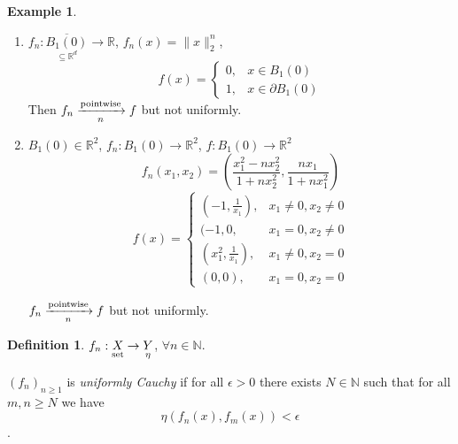 \documentclass[12pt]{amsbook}
\theoremstyle{definition}
\newtheorem{definition}[theorem]{Definition}
\newtheorem{example}[theorem]{Example}
\newcommand{\NN}{{\mathbb N}}
\newcommand{\RR}{{\mathbb R}}
\newcommand{\ra}{\rightarrow} %
\begin{document}
\begin{example} \
\begin{enumerate}
\item $f_n: \underset{\subseteq \RR^d}{\overline{B_1(0)}} \ra \RR$, $f_n(x) = \|x\|^n_2$,
\begin{equation*}
f(x)=\left\{\begin{array}{ll}{0,} & {x \in B_1(0)} \\ {1,} & {x \in \partial B_1(0)}\end{array}\right.
\end{equation*}
Then $f_n \xrightarrow[n]{\textup{pointwise}} f$ but not uniformly.

\item $B_1(0) \in \RR^2$, $f_n : B_1(0) \ra \RR^2$, $f : B_1(0) \ra \RR^2$
\begin{equation*}
f_n(x_1, x_2) = \left(\frac{x_1^2-nx_2^2}{1+nx_2^2}, \frac{nx_1}{1+nx_1^2}\right)
\end{equation*}
\begin{equation*}
f(x)=\left\{\begin{array}{ll}
{(-1, \frac{1}{x_1}),} & {x_1 \neq 0, x_2 \neq 0} \\ 
{(-1, 0,} & {x_1 = 0, x_2 \neq 0} \\ 
{(x_1^2, \frac{1}{x_1}),} & {x_1 \neq 0, x_2 = 0} \\ 
{(0,0),} & {x_1 = 0, x_2 = 0} 
\end{array}\right.
\end{equation*}

$f_n \xrightarrow[n]{\textup{pointwise}} f$ but not uniformly.
\end{enumerate}
\end{example}


\begin{definition}
$f_n: \underset{\textup{set}}X \ra \underset{\eta}Y$, $\forall n \in \NN$.

$(f_n)_{n \geq 1}$ is \emph{uniformly Cauchy} if for all $\epsilon > 0$ there exists $N \in \NN$ such that for all $m, n \geq N$ we have 
\begin{equation*}\eta(f_n(x), f_m(x)) < \epsilon\end{equation*}.
\end{definition}
\end{document}

